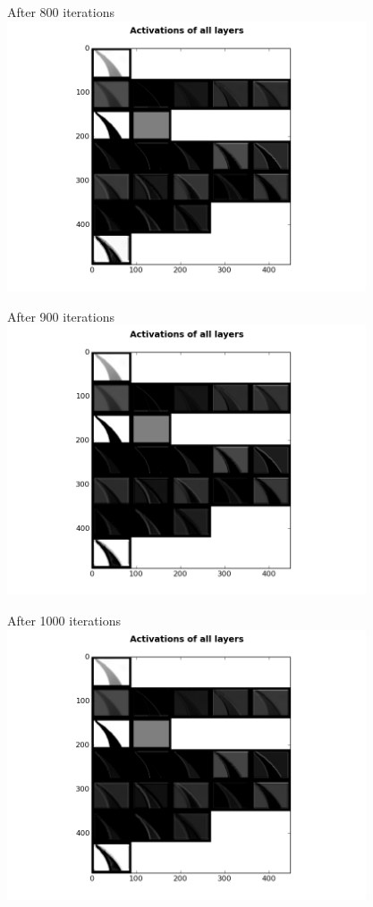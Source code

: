 \begin{frame}{After 800 iterations}
\includegraphics[height=8.0cm]{data/activations/output-800.png}\\ 
\end{frame}

\begin{frame}{After 900 iterations}
\includegraphics[height=8.0cm]{data/activations/output-900.png}\\ 
\end{frame}

\begin{frame}{After 1000 iterations}
\includegraphics[height=8.0cm]{data/activations/output-1000.png}\\ 
\end{frame}

